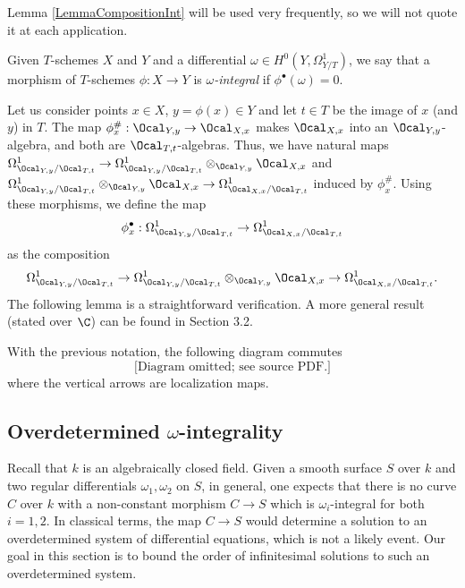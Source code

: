 \begin{remark}
\notready Lemma \ref{LemmaCompositionInt} will be used very frequently, so we will not quote it at each application.
\end{remark}

Given $T$-schemes $X$ and $Y$ and a differential $\omega\in H^0(Y, \Omega^1_{Y/T})$, we say that a morphism of $T$-schemes $\phi:X\to Y$ is \emph{$\omega$-integral} if $\phi^\bullet(\omega)=0$.



Let us consider points $x\in X$, $y=\phi(x)\in Y$ and let $t\in T$ be the image of $x$ (and $y$) in $T$. The map $\phi^\#_x:\Ocal_{Y,y}\to \Ocal_{X,x}$ makes $\Ocal_{X,x}$ into an $\Ocal_{Y,y}$-algebra, and both are $\Ocal_{T,t}$-algebras. Thus, we have natural maps $\Omega^1_{\Ocal_{Y,y}/\Ocal_{T,t}}\to \Omega^1_{\Ocal_{Y,y}/\Ocal_{T,t}}\otimes_{\Ocal_{Y,y}} \Ocal_{X,x}$ and $ \Omega^1_{\Ocal_{Y,y}/\Ocal_{T,t}}\otimes_{\Ocal_{Y,y}} \Ocal_{X,x}\to  \Omega^1_{\Ocal_{X,x}/\Ocal_{T,t}}$ induced by $\phi^\#_x$. Using these morphisms, we define the map
$$
\phi^\bullet_x : \Omega^1_{\Ocal_{Y,y}/\Ocal_{T,t}}\to \Omega^1_{\Ocal_{X,x}/\Ocal_{T,t}}
$$
as the composition
$$
\Omega^1_{\Ocal_{Y,y}/\Ocal_{T,t}}\to \Omega^1_{\Ocal_{Y,y}/\Ocal_{T,t}}\otimes_{\Ocal_{Y,y}} \Ocal_{X,x}\to  \Omega^1_{\Ocal_{X,x}/\Ocal_{T,t}}.
$$
The following lemma is a straightforward verification. A more general result (stated over $\C$) can be found in \cite{GFthesis} Section 3.2.
\begin{lemma}
\notready\label{LemmaCommLoc} With the previous notation, the following diagram commutes
$$
\text{[Diagram omitted; see source PDF.]}
$$
where the vertical arrows are localization maps.
\end{lemma}


\subsection{Overdetermined $\omega$-integrality}\label{SecOver} Recall that $k$ is an algebraically closed field. Given a smooth surface $S$ over $k$ and two regular differentials $\omega_1,\omega_2$ on $S$, in general, one expects that there is no curve $C$ over $k$ with a non-constant morphism $C\to S$ which is $\omega_i$-integral for both $i=1,2$. In classical terms, the map $C\to S$ would determine a solution to an overdetermined system of differential equations, which is not a likely event. Our goal in this section is to bound the order of infinitesimal solutions to such an overdetermined system.



